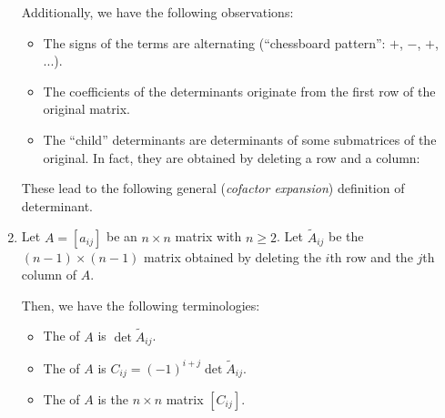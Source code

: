 \begin{enumerate}
Additionally, we have the following observations:
\begin{itemize}
\item The signs of the terms are alternating (``chessboard pattern'': \(+\),
\(-\), \(+\), ...).
\item The coefficients of the determinants originate from the first row of the
original matrix.
\item The ``child'' determinants are determinants of some submatrices of the
original. In fact, they are obtained by deleting a row and a column:
\begin{center}
\quad
{}
\quad
{}
\end{center}
\end{itemize}
These lead to the following general (\emph{cofactor expansion}) definition of
determinant.

\item Let \(A=[a_{ij}]\) be an \(n\times n\) matrix with \(n\ge 2\). Let
\(\widetilde{A}_{ij}\) be the \((n-1)\times (n-1)\) matrix obtained by deleting
the \(i\)th row and the \(j\)th column of \(A\).

Then, we have the following terminologies:
\begin{itemize}
\item The  of \(A\) is \(\det \widetilde{A}_{ij}\).
\item The  of \(A\) is \(C_{ij}=(-1)^{i+j}\det \widetilde{A}_{ij}\).
\item The  of \(A\) is the \(n\times n\) matrix \([C_{ij}]\).
\end{itemize}


\end{enumerate}
